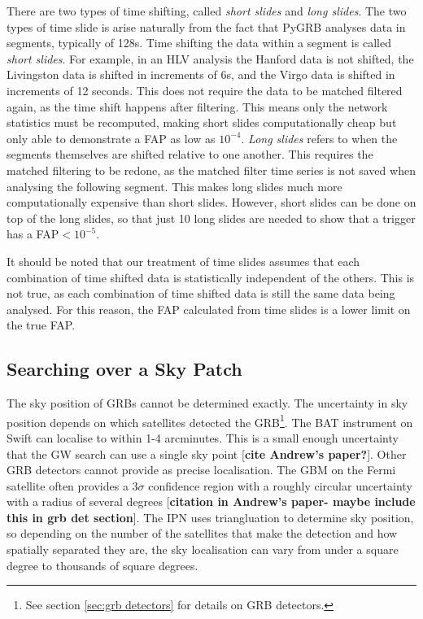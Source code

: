 \documentclass[11pt]{cuthesis}
\begin{document}
There are two types of time shifting, called \textit{short slides} and \textit{long slides}. The two types of time slide is arise naturally from the fact that PyGRB analyses data in segments, typically of 128s. Time shifting the data within a segment is called \textit{short slides}. For example, in an HLV analysis the Hanford data is not shifted, the Livingston data is shifted in increments of 6s, and the Virgo data is shifted in increments of 12 seconds. This does not require the data to be matched filtered again, as the time shift happens after filtering. This means only the network statistics must be recomputed, making short slides computationally cheap but only able to demonstrate a FAP as low as $10^{-4}$. \textit{Long slides} refers to when the segments themselves are shifted relative to one another. This requires the matched filtering to be redone, as the matched filter time series is not saved when analysing the following segment. This makes long slides much more computationally expensive than short slides. However, short slides can be done on top of the long slides, so that just 10 long slides are needed to show that a trigger has a FAP$<10^{-5}$.

It should be noted that our treatment of time slides assumes that each combination of time shifted data is statistically independent of the others. This is not true, as each combination of time shifted data is still the same data being analysed. For this reason, the FAP calculated from time slides is a lower limit on the true FAP. 


\subsection{Searching over a Sky Patch}
The sky position of GRBs cannot be determined exactly. The uncertainty in sky position depends on which satellites detected the GRB\footnote{See section \ref{sec:grb detectors} for details on GRB detectors.}. The BAT instrument on Swift can localise to within 1-4 arcminutes. This is a small enough uncertainty that the GW search can use a single sky point [\textbf{cite Andrew's paper?}]. Other GRB detectors cannot provide as precise localisation. The GBM on the Fermi satellite often provides a 3$\sigma$ confidence region with a roughly circular uncertainty with a radius of several degrees [\textbf{citation in Andrew's paper- maybe include this in grb det section}]. The IPN uses triangluation to determine sky position, so depending on the number of the satellites that make the detection and how spatially separated they are, the sky localisation can vary from under a square degree to thousands of square degrees. 
\end{document}
